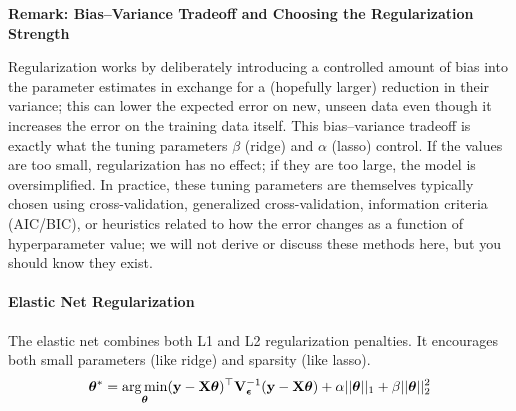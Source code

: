 \begin{definitionBox}
\textbf{Remark: Bias--Variance Tradeoff and Choosing the Regularization Strength}

Regularization works by deliberately introducing a controlled amount of bias into the parameter estimates in exchange for a (hopefully larger) reduction in their variance; this can lower the expected error on new, unseen data even though it increases the error on the training data itself. This bias--variance tradeoff is exactly what the tuning parameters $\beta$ (ridge) and $\alpha$ (lasso) control. If the values are too small, regularization has no effect; if they are too large, the model is oversimplified. In practice, these tuning parameters are themselves typically chosen using cross-validation, generalized cross-validation, information criteria (AIC/BIC), or heuristics related to how the error changes as a function of hyperparameter value; we will not derive or discuss these methods here, but you should know they exist.
\end{definitionBox}

\paragraph*{Elastic Net Regularization}
The elastic net combines both L1 and L2 regularization penalties. It encourages both small parameters (like ridge) and sparsity (like lasso).
\begin{equation}
    \boldsymbol{\theta}^* = \operatorname*{arg\,min}_{\boldsymbol{\theta}} (\mathbf{y} - \mathbf{X}\boldsymbol{\theta})^\top \mathbf{V}_{\boldsymbol{\epsilon}}^{-1} (\mathbf{y} - \mathbf{X}\boldsymbol{\theta}) + \alpha||\boldsymbol{\theta}||_1 + \beta||\boldsymbol{\theta}||_2^2
    \label{eq:elastic-net-regularization}
\end{equation}

